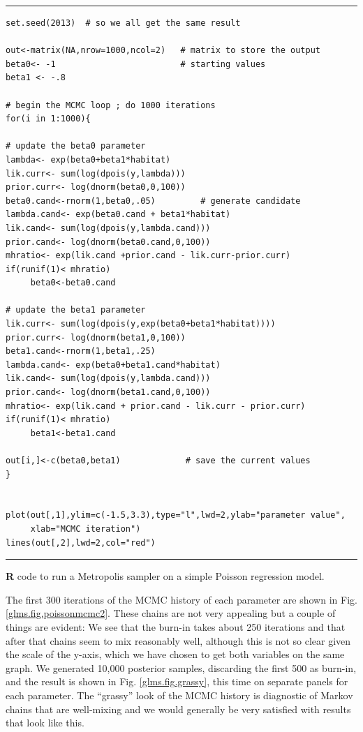 {\begin{panel}[htp]
\centering
\rule[0.15in]{\textwidth}{.03in}
{\small
\begin{verbatim}
set.seed(2013)  # so we all get the same result

out<-matrix(NA,nrow=1000,ncol=2)   # matrix to store the output
beta0<- -1                         # starting values
beta1 <- -.8

# begin the MCMC loop ; do 1000 iterations
for(i in 1:1000){

# update the beta0 parameter
lambda<- exp(beta0+beta1*habitat)
lik.curr<- sum(log(dpois(y,lambda)))
prior.curr<- log(dnorm(beta0,0,100))
beta0.cand<-rnorm(1,beta0,.05)         # generate candidate
lambda.cand<- exp(beta0.cand + beta1*habitat)
lik.cand<- sum(log(dpois(y,lambda.cand)))
prior.cand<- log(dnorm(beta0.cand,0,100))
mhratio<- exp(lik.cand +prior.cand - lik.curr-prior.curr)
if(runif(1)< mhratio)
     beta0<-beta0.cand

# update the beta1 parameter
lik.curr<- sum(log(dpois(y,exp(beta0+beta1*habitat))))
prior.curr<- log(dnorm(beta1,0,100))
beta1.cand<-rnorm(1,beta1,.25)
lambda.cand<- exp(beta0+beta1.cand*habitat)
lik.cand<- sum(log(dpois(y,lambda.cand)))
prior.cand<- log(dnorm(beta1.cand,0,100))
mhratio<- exp(lik.cand + prior.cand - lik.curr - prior.curr)
if(runif(1)< mhratio)
     beta1<-beta1.cand

out[i,]<-c(beta0,beta1)             # save the current values
}


plot(out[,1],ylim=c(-1.5,3.3),type="l",lwd=2,ylab="parameter value",
     xlab="MCMC iteration")
lines(out[,2],lwd=2,col="red")
\end{verbatim}
}
\rule[-0.15in]{\textwidth}{.03in}
\caption{
{\bf R} code to run a Metropolis sampler on a simple Poisson regression model.
}
\label{glms.panel.poisreg}
\end{panel}

The first 300 iterations of the MCMC history of each parameter
are shown in Fig. \ref{glms.fig.poissonmcmc2}. These chains are
not very appealing but a couple of things are evident: 
We see
that the burn-in takes about 250 iterations and that after that chains seem to mix 
reasonably well, although this is not so clear given the scale of the
y-axis, which we have chosen to get both variables on the same graph.
We generated 10,000 posterior samples,
discarding the first 500 as burn-in, and the result is shown in
Fig. \ref{glms.fig.grassy}, this time on separate panels for each
parameter.
The ``grassy''
look of the MCMC history is diagnostic of Markov chains that are
well-mixing and we would generally be very satisfied with results that
look like this.

}
